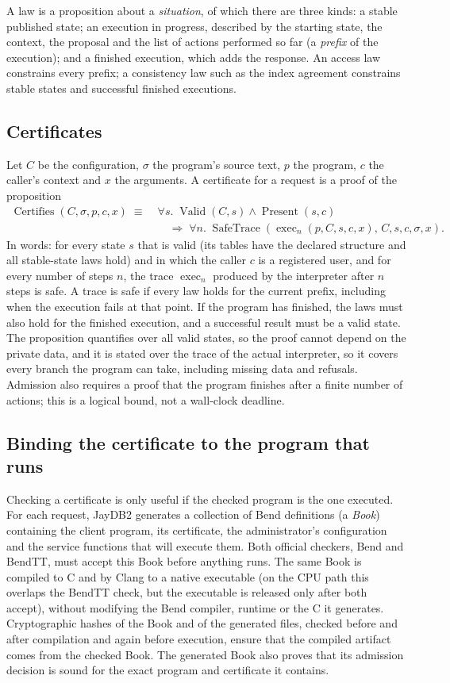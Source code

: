 \documentclass[12pt]{article}
\newcommand{\op}[1]{\operatorname{#1}}
\begin{document}
A law is a proposition about a \emph{situation}, of which there are three
kinds: a stable published state; an execution in progress, described by the
starting state, the context, the proposal and the list of actions performed so
far (a \emph{prefix} of the execution); and a finished execution, which adds the
response. An access law constrains every prefix; a consistency law such as the
index agreement constrains stable states and successful finished executions.

\subsection{Certificates}
Let $C$ be the configuration, $\sigma$ the program's source text, $p$ the
program, $c$ the caller's context and $x$ the arguments. A certificate for a
request is a proof of the proposition
\[
\begin{aligned}
\op{Certifies}(C,\sigma,p,c,x) \;\equiv\;
&\forall s.\; \op{Valid}(C,s) \wedge \op{Present}(s,c)\\
&\quad\Longrightarrow\; \forall n.\;
\op{SafeTrace}(\op{exec}_n(p,C,s,c,x),\,C,s,c,\sigma,x).
\end{aligned}
\]
In words: for every state $s$ that is valid (its tables have the declared
structure and all stable-state laws hold) and in which the caller $c$ is a
registered user, and for every number of steps $n$, the trace $\op{exec}_n$
produced by the interpreter after $n$ steps is safe. A trace is safe if every
law holds for the current prefix, including when the execution fails at that
point. If the program has finished, the laws must also hold for the finished
execution, and a successful result must be a valid state. The proposition
quantifies over all valid states, so the proof cannot depend on the private data,
and it is stated over the trace of the actual interpreter, so it covers every
branch the program can take, including missing data and refusals. Admission also
requires a proof that the program finishes after a finite number of actions; this is a
logical bound, not a wall-clock deadline.

\subsection{Binding the certificate to the program that runs}
Checking a certificate is only useful if the checked program is the one
executed. For each request, JayDB2 generates a collection of Bend
definitions (a \emph{Book}) containing the client program, its certificate, the
administrator's configuration and the service functions that will execute
them. Both official checkers,
Bend and BendTT, must accept this Book before anything runs. The same Book is
compiled to C and by Clang to a native executable (on the CPU path this overlaps
the BendTT check, but the executable is released only after both accept), without modifying the Bend compiler, runtime
or the C it generates. Cryptographic hashes of the Book and of the generated files,
checked before and after compilation and again before execution, ensure that the compiled artifact comes from the checked Book.
The generated Book also proves that its admission decision is sound for the
exact program and certificate it contains.
\end{document}
